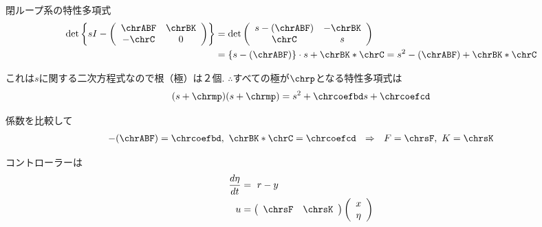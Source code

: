 閉ループ系の特性多項式
\begin{align*}
	\det
	\left \{
		sI- 
		\left (
		\begin{array}{cc}
		 \chrABF & \chrBK \\
		 -\chrC & 0
		\end{array}
		\right )
	\right \}
	&=
	\det
	\left ( 
	\begin{array}{cc}
	 s-(\chrABF) & -\chrBK \\
	 \chrC & s
	\end{array}
	\right )
\\
	&=
	\{ s-(\chrABF) \} \cdot s + \chrBK * \chrC
	=
	s^2 -(\chrABF)+\chrBK*\chrC
\end{align*}

これは$s$に関する二次方程式なので根（極）は２個.
$\therefore$すべての極が$\chrp$となる特性多項式は
\begin{align*}
	(s+\chrmp)(s+\chrmp) = s^2+ \chrcoefbd s+\chrcoefcd
\end{align*}

係数を比較して
\begin{align*}
	-(\chrABF)=\chrcoefbd, \ \chrBK*\chrC = \chrcoefcd \ \ \Rightarrow \ \ F=\chrsF, \ K=\chrsK
\end{align*}

コントローラーは
\begin{align*}
	\frac{d \eta}{dt}&= \ r-y 
\\
	u &= \left ( \begin{array}{cc}
			\chrsF & \chrsK \end{array} \right )
		\left (
		\begin{array}{c}
		 x \\ \eta 
		\end{array}
		\right )
\end{align*}





